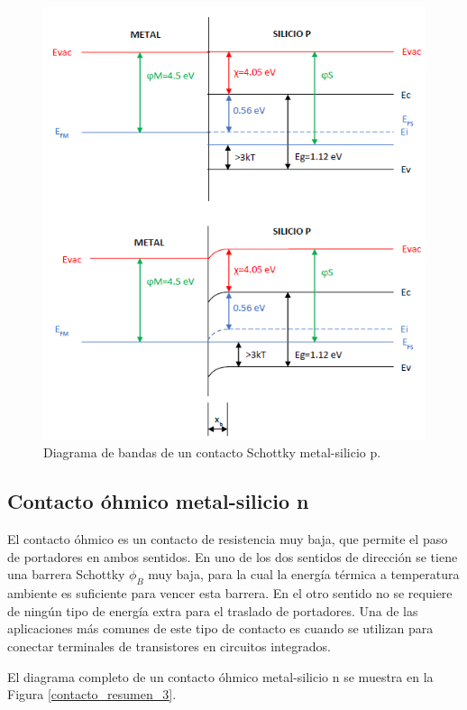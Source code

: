 \begin{figure}[H]
    \centering
    \includegraphics{figuras/contacto_resumen_2.png}
    \caption{Diagrama de bandas de un contacto Schottky metal-silicio p.}
    \label{contacto_resumen_2}
\end{figure}

\newpage
\subsection{Contacto óhmico metal-silicio n}

El contacto óhmico es un contacto de resistencia muy baja, que permite el paso de portadores en ambos sentidos. En uno de los dos sentidos de dirección se tiene una barrera Schottky $\phi_B$ muy baja, para la cual la energía térmica a temperatura ambiente es suficiente para vencer esta barrera. En el otro sentido no se requiere de ningún tipo de energía extra para el traslado de portadores. Una de las aplicaciones más comunes de este tipo de contacto es cuando se utilizan para conectar terminales de transistores en circuitos integrados.

El diagrama completo de un contacto óhmico metal-silicio n se muestra en la Figura \ref{contacto_resumen_3}.

